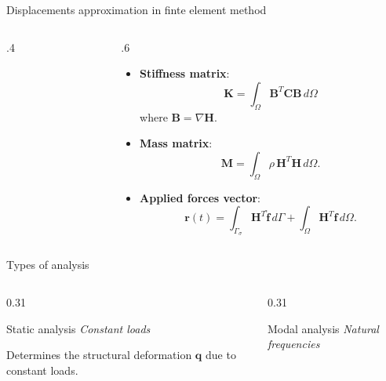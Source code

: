\documentclass[aspectratio=169]{beamer}
\begin{document}
{\begin{frame}{Displacements approximation in finte element method}
\begin{columns}[T]
\begin{column}{.4\textwidth}
\begin{center}
        \end{center}
      \end{column}
      \begin{column}{.6\textwidth}
        \begin{block}{}
          \begin{itemize}
            \item \textbf{Stiffness matrix}:
                  $$\mathbf K=\int_\Omega \mathbf B^T\mathbf C\mathbf B \, d\Omega$$
                  where $\mathbf B=\nabla \mathbf H$.
            \item \textbf{Mass matrix}:
                  $$\mathbf M=\int_\Omega \rho\, \mathbf H^T\mathbf H \, d\Omega.$$
            \item \textbf{Applied forces vector}:
                  $$\mathbf r(t)=\int_{\Gamma_\sigma} \mathbf H^{T}\mathbf{\hat f} \, d\Gamma+\int_{\Omega} \mathbf H^{T}\mathbf f\, d\Omega.$$
          \end{itemize}
        \end{block}
      \end{column}
    \end{columns}
  \end{frame}


  \begin{frame}{Types of analysis}
    \begin{columns}[T,onlytextwidth]
      \begin{column}{0.31\textwidth}
        \begin{block}{Static analysis}
          \centering
          \small
          \emph{Constant loads}

          \vspace{0.25cm}

          Determines the structural deformation
          $\mathbf q$ due to constant loads.
        \end{block}
      \end{column}

      \begin{column}{0.31\textwidth}
        \begin{block}{Modal analysis}
          \centering
          \small
          \emph{Natural frequencies}


\end{block}
\end{column}
\end{columns}
\end{frame}}
\end{document}
